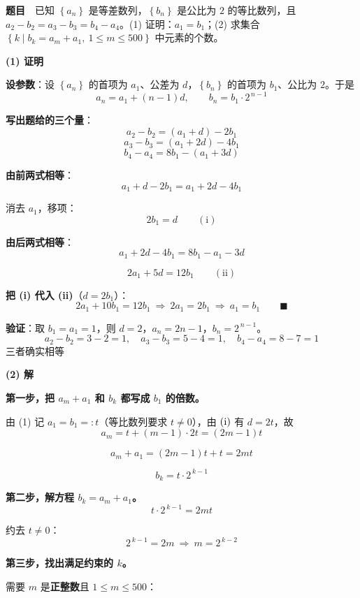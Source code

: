 \par\medskip



\textbf{题目}　已知 $\left\{a_n\right\}$ 是等差数列，$\left\{b_n\right\}$ 是公比为 $2$ 的等比数列，且 $a_2-b_2=a_3-b_3=b_4-a_4$。(1) 证明：$a_1=b_1$；(2) 求集合 $\left\{k\mid b_k=a_m+a_1,\ 1\le m\le500\right\}$ 中元素的个数。

\par\medskip

\textbf{(1) 证明}

\textbf{设参数}：设 $\left\{a_n\right\}$ 的首项为 $a_1$、公差为 $d$，$\left\{b_n\right\}$ 的首项为 $b_1$、公比为 $2$。于是
\[a_n=a_1+(n-1)d,\qquad b_n=b_1\cdot2^{\,n-1}\]

\textbf{写出题给的三个量}：
\[a_2-b_2=\left(a_1+d\right)-2b_1\]
\[a_3-b_3=\left(a_1+2d\right)-4b_1\]
\[b_4-a_4=8b_1-\left(a_1+3d\right)\]

\textbf{由前两式相等}：
\[a_1+d-2b_1=a_1+2d-4b_1\]

消去 $a_1$，移项：
\[2b_1=d\qquad(\text{i})\]

\textbf{由后两式相等}：
\[a_1+2d-4b_1=8b_1-a_1-3d\]

\[2a_1+5d=12b_1\qquad(\text{ii})\]

\textbf{把 (i) 代入 (ii)}（$d=2b_1$）：
\[2a_1+10b_1=12b_1\ \Longrightarrow\ 2a_1=2b_1\ \Longrightarrow\ a_1=b_1\qquad\blacksquare\]

\textbf{验证}：取 $b_1=a_1=1$，则 $d=2$，$a_n=2n-1$，$b_n=2^{\,n-1}$。
\[a_2-b_2=3-2=1,\quad a_3-b_3=5-4=1,\quad b_4-a_4=8-7=1\]
三者确实相等 

\par\medskip

\textbf{(2) 解}

\textbf{第一步，把 $a_m+a_1$ 和 $b_k$ 都写成 $b_1$ 的倍数。}

由 (1) 记 $a_1=b_1=:t$（等比数列要求 $t\ne0$），由 $(\text i)$ 有 $d=2t$，故
\[a_m=t+(m-1)\cdot2t=(2m-1)t\]

\[a_m+a_1=(2m-1)t+t=2mt\]

\[b_k=t\cdot2^{\,k-1}\]

\textbf{第二步，解方程 $b_k=a_m+a_1$。}
\[t\cdot2^{\,k-1}=2mt\]

约去 $t\ne0$：
\[2^{\,k-1}=2m\ \Longrightarrow\ m=2^{\,k-2}\]

\textbf{第三步，找出满足约束的 $k$。}

需要 $m$ 是\textbf{正整数}且 $1\le m\le500$：

